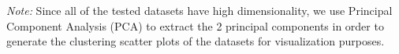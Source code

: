 \textit{Note:} Since all of the tested datasets have high dimensionality, we use Principal Component Analysis (PCA) to extract the 2 principal components in order to generate the clustering scatter plots of the datasets for visualization purposes.





% 
